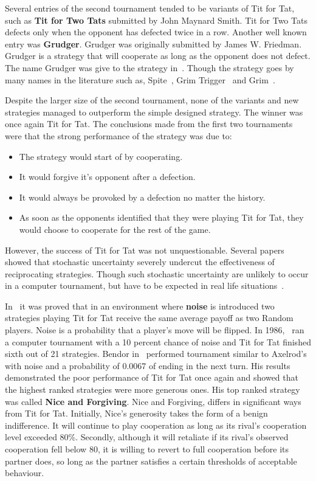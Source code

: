 \documentclass{article}
\theoremstyle{definition}
\begin{document}
Several entries of the second tournament tended to be variants of Tit for Tat, such as
\textbf{Tit for Two Tats} submitted by John Maynard Smith. Tit for Two
Tats defects only when the opponent has defected twice in a row. Another well
known entry was \textbf{Grudger}.
Grudger was originally submitted by James W. Friedman. Grudger is a strategy that
will cooperate as long as the opponent does not defect. The name Grudger was give
to the strategy in~\cite{Li2014}. Though the strategy goes by many names in the
literature such as, Spite~\cite{Beaufils1997}, Grim Trigger~\cite{Banks1990} and
Grim~\cite{Van2015}.

Despite the larger size of the second tournament, none of the variants and new strategies managed
to outperform the simple designed strategy. The winner was once again Tit for Tat.
The conclusions made from the first two tournaments were that the strong performance
of the strategy was due to:

\begin{itemize}
    \item The strategy would start of by cooperating.
    \item It would forgive it's opponent after a defection.
    \item It would always be provoked by a defection no matter the history.
    \item As soon as the opponents identified that they were playing Tit for Tat,
    they would choose to cooperate for the rest of the game.
\end{itemize}

However, the success of Tit for Tat was not unquestionable. Several papers
showed that  stochastic uncertainty severely undercut the effectiveness
of reciprocating strategies. Though such stochastic uncertainty
are unlikely to occur in a computer tournament, but have to be expected in real
life situations~\cite{Milinski1987}.

In~\cite{Molander1985} it was proved that
in an environment where \textbf{noise} is introduced two strategies playing Tit
for Tat receive the same average payoff as two Random players. Noise is a probability
that a player's move will be flipped. In 1986,~\cite{Donninger1986} ran a computer
tournament with a 10 percent chance of noise and Tit for Tat finished sixth out of
21 strategies. Bendor in~\cite{Bendor1991} performed tournament similar to Axelrod's
with noise and a probability of 0.0067 of ending in the next turn.
His results demonstrated the poor performance of Tit for Tat once again and showed
that the highest ranked strategies were more generous ones.
His top ranked strategy was called \textbf{Nice and Forgiving}.
Nice and Forgiving, differs in significant ways
from Tit for Tat. Initially, Nice's generosity takes the form of a benign indifference.
It will continue to play cooperation as long as its rival's cooperation level
exceeded 80\%. Secondly, although it will retaliate if its rival's observed cooperation fell
below 80, it is willing to revert to full cooperation before its partner does,
so long as the partner satisfies a certain thresholds of acceptable behaviour.
\end{document}
